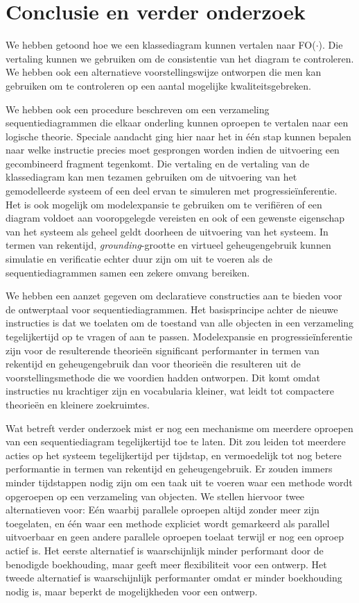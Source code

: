 \chapter{Conclusie en verder onderzoek}\label{sec:conclusie}
We hebben getoond hoe we een klassediagram kunnen vertalen naar FO($\cdot$). Die vertaling kunnen we gebruiken om de consistentie van het diagram te controleren. We hebben ook een alternatieve voorstellingswijze ontworpen die men kan gebruiken om te controleren op een aantal mogelijke kwaliteitsgebreken.

We hebben ook een procedure beschreven om een verzameling sequentiediagrammen die elkaar onderling kunnen oproepen te vertalen naar een logische theorie. Speciale aandacht ging hier naar het in \'e\'en stap kunnen bepalen naar welke instructie precies moet gesprongen worden indien de uitvoering een gecombineerd fragment tegenkomt. Die vertaling en de vertaling van de klassediagram kan men tezamen gebruiken om de uitvoering van het gemodelleerde systeem of een deel ervan te simuleren met progressie\"inferentie. Het is ook mogelijk om modelexpansie te gebruiken om te verifi\"eren of een diagram voldoet aan vooropgelegde vereisten en ook of een gewenste eigenschap van het systeem als geheel geldt doorheen de uitvoering van het systeem. In termen van rekentijd, \textit{grounding}-grootte en virtueel geheugengebruik kunnen simulatie en verificatie echter duur zijn om uit te voeren als de sequentiediagrammen samen een zekere omvang bereiken.

We hebben een aanzet gegeven om declaratieve constructies aan te bieden voor de ontwerptaal voor sequentiediagrammen. Het basisprincipe achter de nieuwe instructies is dat we toelaten om de toestand van alle objecten in een verzameling tegelijkertijd op te vragen of aan te passen. Modelexpansie en progressie\"inferentie zijn voor de resulterende theorie\"en significant performanter in termen van rekentijd en geheugengebruik dan voor theorie\"en die resulteren uit de voorstellingsmethode die we voordien hadden ontworpen. Dit komt omdat instructies nu krachtiger zijn en vocabularia kleiner, wat leidt tot compactere theorie\"en en kleinere zoekruimtes.

Wat betreft verder onderzoek mist er nog een mechanisme om meerdere oproepen van een sequentiediagram tegelijkertijd toe te laten. Dit zou leiden tot meerdere acties op het systeem tegelijkertijd per tijdstap, en vermoedelijk tot nog betere performantie in termen van rekentijd en geheugengebruik. Er zouden immers minder tijdstappen nodig zijn om een taak uit te voeren waar een methode wordt opgeroepen op een verzameling van objecten. We stellen hiervoor twee alternatieven voor: E\'en waarbij parallele oproepen altijd zonder meer zijn toegelaten, en \'e\'en waar een methode expliciet wordt gemarkeerd als parallel uitvoerbaar en geen andere parallele oproepen toelaat terwijl er nog een oproep actief is. Het eerste alternatief is waarschijnlijk minder performant door de benodigde boekhouding, maar geeft meer flexibiliteit voor een ontwerp. Het tweede alternatief is waarschijnlijk performanter omdat er minder boekhouding nodig is, maar beperkt de mogelijkheden voor een ontwerp.

